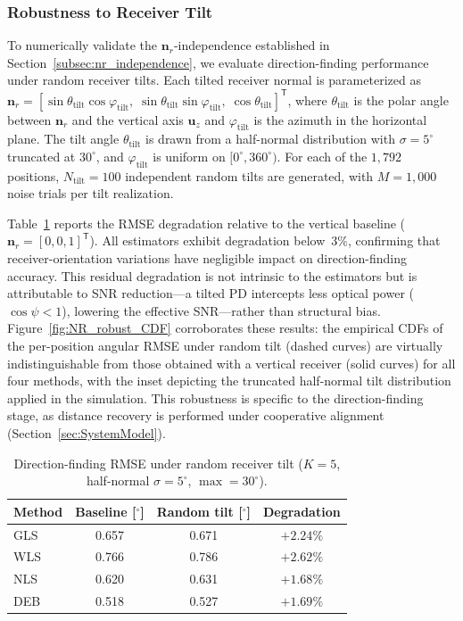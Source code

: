 \documentclass[journal]{IEEEtran}
\begin{document}
\subsubsection{Robustness to Receiver Tilt}

To numerically validate the $\mathbf{n}_r$-independence established in Section~\ref{subsec:nr_independence}, we evaluate direction-finding performance under random receiver tilts. Each tilted receiver normal is parameterized as $\mathbf{n}_r = [\sin\theta_{\mathrm{tilt}}\cos\varphi_{\mathrm{tilt}},\;\sin\theta_{\mathrm{tilt}}\sin\varphi_{\mathrm{tilt}},\;\cos\theta_{\mathrm{tilt}}]^{\mathsf T}$, where $\theta_{\mathrm{tilt}}$ is the polar angle between $\mathbf{n}_r$ and the vertical axis $\mathbf{u}_z$ and $\varphi_{\mathrm{tilt}}$ is the azimuth in the horizontal plane. The tilt angle $\theta_{\mathrm{tilt}}$ is drawn from a half-normal distribution with $\sigma=5^\circ$ truncated at $30^\circ$, and $\varphi_{\mathrm{tilt}}$ is uniform on $[0^\circ,360^\circ)$. For each of the $1{,}792$ positions, $N_{\mathrm{tilt}}=100$ independent random tilts are generated, with $M=1{,}000$ noise trials per tilt realization.

Table~\ref{tab:tilt_robustness} reports the RMSE degradation relative to the vertical baseline ($\mathbf{n}_r=[0,0,1]^{\mathsf T}$). All estimators exhibit degradation below~$3\%$, confirming that receiver-orientation variations have negligible impact on direction-finding accuracy. This residual degradation is not intrinsic to the estimators but is attributable to SNR reduction---a tilted PD intercepts less optical power ($\cos\psi<1$), lowering the effective SNR---rather than structural bias. Figure~\ref{fig:NR_robust_CDF} corroborates these results: the empirical CDFs of the per-position angular RMSE under random tilt (dashed curves) are virtually indistinguishable from those obtained with a vertical receiver (solid curves) for all four methods, with the inset depicting the truncated half-normal tilt distribution applied in the simulation. This robustness is specific to the direction-finding stage, as distance recovery is performed under cooperative alignment (Section~\ref{sec:SystemModel}).

\begin{table}[t]
\centering
\caption{Direction-finding RMSE under random receiver tilt ($K=5$, half-normal $\sigma=5^\circ$, $\max=30^\circ$).}
\label{tab:tilt_robustness}
\begin{tabular}{|l|c|c|c|}
\hline
\textbf{Method} & \textbf{Baseline [$^\circ$]} & \textbf{Random tilt [$^\circ$]} & \textbf{Degradation} \\ \hline
GLS & 0.657 & 0.671 & $+2.24\%$ \\ \hline
WLS & 0.766 & 0.786 & $+2.62\%$ \\ \hline
NLS & 0.620 & 0.631 & $+1.68\%$ \\ \hline
DEB & 0.518 & 0.527 & $+1.69\%$ \\ \hline
\end{tabular}
\end{table}
\end{document}
